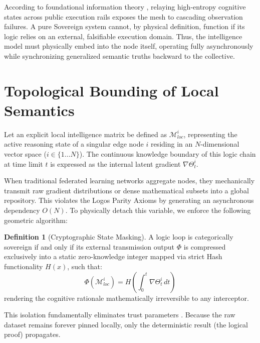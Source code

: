 \documentclass[12pt, a4paper]{article}
\theoremstyle{plain}
\theoremstyle{definition}
\newtheorem{definition}[theorem]{Definition}
\begin{document}
According to foundational information theory \cite{shannon1948mathematical}, relaying high-entropy cognitive states across public execution rails exposes the mesh to cascading observation failures. A pure Sovereign system cannot, by physical definition, function if its logic relies on an external, falsifiable execution domain. Thus, the intelligence model must physically embed into the node itself, operating fully asynchronously while synchronizing generalized semantic truths backward to the collective.

\section{Topological Bounding of Local Semantics}
Let an explicit local intelligence matrix be defined as $\mathcal{M}_{loc}^{i}$, representing the active reasoning state of a singular edge node $i$ residing in an $N$-dimensional vector space ($i \in \{1 \dots N\}$). The continuous knowledge boundary of this logic chain at time limit $t$ is expressed as the internal latent gradient $\nabla \Theta_t^i$.

When traditional federated learning networks aggregate nodes, they mechanically transmit raw gradient distributions or dense mathematical subsets into a global repository. This violates the Logos Parity Axioms by generating an asynchronous dependency $O(N)$.
To physically detach this variable, we enforce the following geometric algorithm:

\begin{definition}[Cryptographic State Masking]
A logic loop is categorically sovereign if and only if its external transmission output $\Phi$ is compressed exclusively into a static zero-knowledge integer mapped via strict Hash functionality $H(x)$, such that:
\begin{equation}
    \Phi\left(\mathcal{M}_{loc}^i\right) = H\left(\int_{0}^{t} \nabla \Theta_t^i \, dt\right)
\end{equation}
rendering the cognitive rationale mathematically irreversible to any interceptor.
\end{definition}

This isolation fundamentally eliminates trust parameters \cite{lamport1978time}. Because the raw dataset remains forever pinned locally, only the deterministic result (the logical proof) propagates. 
\end{document}
